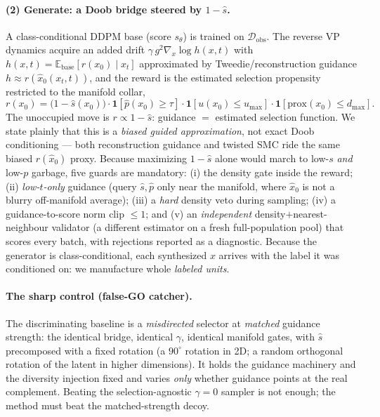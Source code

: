 \documentclass[10pt]{article}
\newcommand{\E}{\mathbb{E}}
\newcommand{\shat}{\hat s}
\newcommand{\phat}{\hat p}
\newcommand{\Dobs}{\mathcal{D}_{\mathrm{obs}}}
\begin{document}
\paragraph{(2) Generate: a Doob bridge steered by $1-\shat$.}
A class-conditional DDPM base (score $s_\theta$) is trained on $\Dobs$. The
reverse VP dynamics acquire an added drift $\gamma\,g^2\nabla_x\log h(x,t)$ with
$h(x,t)=\E_{\text{base}}[r(x_0)\mid x_t]$ approximated by Tweedie/reconstruction
guidance $h\approx r(\hat x_0(x_t,t))$, and the reward is the estimated selection
propensity restricted to the manifold collar,
\begin{equation}
r(x_0) = \big(1-\shat(x_0)\big)\cdot\mathbf 1[\phat(x_0)\!\ge\!\tau]\cdot
         \mathbf 1[u(x_0)\!\le\!u_{\max}]\cdot\mathbf 1[\text{prox}(x_0)\!\le\!d_{\max}].
\label{eq:reward}
\end{equation}
The unoccupied move is $r\propto 1-\shat$: guidance $=$ estimated selection
function. We state plainly that this is a \emph{biased guided approximation}, not
exact Doob conditioning --- both reconstruction guidance and twisted SMC ride the
same biased $r(\hat x_0)$ proxy. Because maximizing $1-\shat$ alone would march
to low-$s$ \emph{and} low-$p$ garbage, five guards are mandatory: (i) the density
gate inside the reward; (ii) \emph{low-$t$-only} guidance (query $\shat,\phat$
only near the manifold, where $\hat x_0$ is not a blurry off-manifold average);
(iii) a \emph{hard} density veto during sampling; (iv) a guidance-to-score norm
clip $\le 1$; and (v) an \emph{independent} density${+}$nearest-neighbour
validator (a different estimator on a fresh full-population pool) that scores
every batch, with rejections reported as a diagnostic. Because the generator is
class-conditional, each synthesized $x$ arrives with the label it was
conditioned on: we manufacture whole \emph{labeled units}.

\paragraph{The sharp control (false-GO catcher).} The discriminating baseline is
a \emph{misdirected} selector at \emph{matched} guidance strength: the identical
bridge, identical $\gamma$, identical manifold gates, with $\shat$ precomposed
with a fixed rotation (a $90^\circ$ rotation in 2D; a random orthogonal rotation
of the latent in higher dimensions). It holds the guidance machinery and the
diversity injection fixed and varies \emph{only} whether guidance points at the
real complement. Beating the selection-agnostic $\gamma{=}0$ sampler is not
enough; the method must beat the matched-strength decoy.
\end{document}
